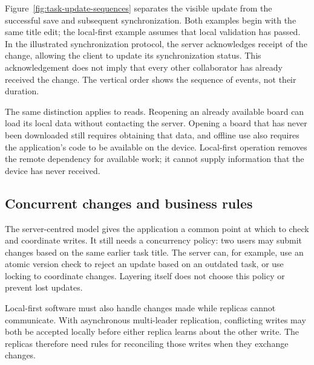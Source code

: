 Figure~\ref{fig:task-update-sequences} separates the visible update from the successful save and subsequent synchronization.
Both examples begin with the same title edit; the local-first example assumes that local validation has passed.
In the illustrated synchronization protocol, the server acknowledges receipt of the change, allowing the client to update its synchronization status.
This acknowledgement does not imply that every other collaborator has already received the change.
The vertical order shows the sequence of events, not their duration.

\begin{illustration}[htbp]
	\centering
	\caption{Saving a title edit with server confirmation or local persistence}
	\label{fig:task-update-sequences}
	\begingroup
	
	\endgroup
\end{illustration}

The same distinction applies to reads.
Reopening an already available board can load its local data without contacting the server.
Opening a board that has never been downloaded still requires obtaining that data, and offline use also requires the application's code to be available on the device.
Local-first operation removes the remote dependency for available work; it cannot supply information that the device has never received.

\subsection{Concurrent changes and business rules}

The server-centred model gives the application a common point at which to check and coordinate writes.
It still needs a concurrency policy: two users may submit changes based on the same earlier task title.
The server can, for example, use an atomic version check to reject an update based on an outdated task, or use locking to coordinate changes.
Layering itself does not choose this policy or prevent lost updates.
\parencite[Chapter~7]{designing-data-intensive-applications}

Local-first software must also handle changes made while replicas cannot communicate.
With asynchronous multi-leader replication, conflicting writes may both be accepted locally before either replica learns about the other write.
The replicas therefore need rules for reconciling those writes when they exchange changes.
\parencite[Chapter~5]{designing-data-intensive-applications}

